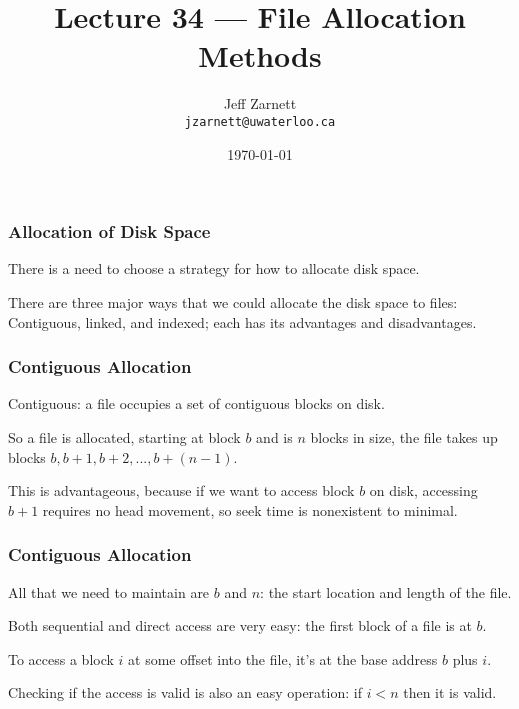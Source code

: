 

\title{Lecture 34 --- File Allocation Methods }

\author{Jeff Zarnett \\ \small \texttt{jzarnett@uwaterloo.ca}}
\date{\today}




\begin{frame}
  \titlepage

 \end{frame}


\begin{frame}
\frametitle{Allocation of Disk Space}

There is a need to choose a strategy for how to allocate disk space. 

There are three major ways that we could allocate the disk space to files:\\
\quad Contiguous, linked, and indexed; each has its advantages and disadvantages.


\end{frame}

\begin{frame}
\frametitle{Contiguous Allocation}
Contiguous: a file occupies a set of contiguous blocks on disk. 

So a file is allocated, starting at block $b$ and is $n$ blocks in size, the file takes up blocks $b, b+1, b+2, ..., b+(n-1)$. 

This is advantageous, because if we want to access block $b$ on disk, accessing $b+1$ requires no head movement, so seek time is nonexistent to minimal.

\end{frame}

\begin{frame}
\frametitle{Contiguous Allocation}

All that we need to maintain are $b$ and $n$: the start location and length of the file. 

Both sequential and direct access are very easy: the first block of a file is at $b$. 

To access a block $i$ at some offset into the file, it's at the base address $b$ plus $i$. 

Checking if the access is valid is also an easy operation: if $i < n$ then it is valid.

\end{frame}

